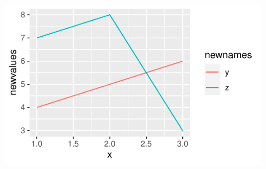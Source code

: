 \documentclass[nofonts,]{tufte-handout}
\begin{document}
\includegraphics{bar-charts-in-ggplot-with-multiple-outcomes_files/figure-latex/unnamed-chunk-7-1}
\end{document}
